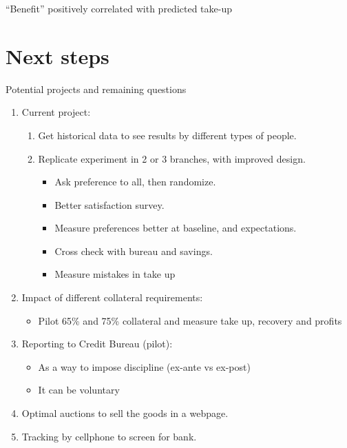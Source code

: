 \documentclass[9pt]{beamer}
\begin{document}
\begin{frame}{``Benefit'' positively correlated with predicted take-up}
\end{frame}




\section{Next steps}

\begin{frame}{Potential projects and remaining questions}

\begin{enumerate}

    \item Current project:
    \begin{enumerate}
        \item Get historical data to see results by different types of people.
        \item Replicate experiment in 2 or 3 branches, with improved design.
        \begin{itemize}
            \item Ask preference to all, then randomize.
            \item Better satisfaction survey.
            \item Measure preferences better at baseline, and expectations.
            \item Cross check with bureau and savings.
            \item Measure mistakes in take up
        \end{itemize}
    \end{enumerate}
    
    \vfill
    \item Impact of different collateral requirements:
    \begin{itemize}
        \item Pilot 65\% and 75\% collateral and measure take up, recovery and profits
    \end{itemize}
    
    \vfill
    \item Reporting to Credit Bureau (pilot):
    \begin{itemize}
        \item As a way to impose discipline (ex-ante vs ex-post)
        \item It can be voluntary
    \end{itemize}

    \vfill
    \item Optimal auctions to sell the goods in a webpage.
    
    \vfill
    \item Tracking by cellphone to screen for bank.

\end{enumerate}
\end{frame}
\end{document}
